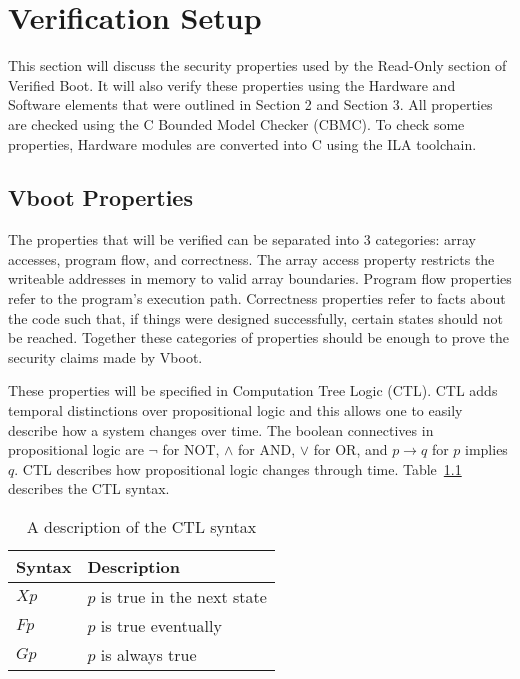 \chapter{Verification Setup}\label{sec:Verif}

This section will discuss the security properties used by the Read-Only
section of Verified Boot. 
It will also verify these properties using the Hardware and
Software elements that were outlined in Section 2 and Section 3.
All properties are checked using the C Bounded Model Checker (CBMC).
To check some properties, Hardware modules are converted into C using the ILA toolchain.

\section{Vboot Properties}

The properties that will be verified can be separated into 3 categories: array accesses, program flow, and correctness.
The array access property restricts the writeable addresses in memory to valid array boundaries. 
Program flow properties refer to the program's execution path.
Correctness properties refer to facts about the code such that, if things were
designed successfully, certain states should not be reached.
Together these categories of properties should be enough to prove the security claims made by Vboot.

These properties will be specified in Computation Tree Logic (CTL). 
CTL adds temporal distinctions over propositional logic and this allows one to easily describe how a system changes over time.
The boolean connectives in propositional logic are $\lnot$ for NOT, $\land$ for
AND, $\lor$ for OR, and $p \to q$ for $p$ implies $q$.
CTL describes how propositional logic changes through time.
Table~\ref{ctl_syn} describes the CTL syntax.

\begin{table}[!htbp]
    \centering
    \caption{A description of the CTL syntax}\label{ctl_syn}
    \begin{tabular}{ll}
        \toprule Syntax & Description  \\ \bottomrule 
        $Xp$ & $p$ is true in the next state\\ 
        $Fp$ & $p$ is true eventually\\ 
        $Gp$ & $p$ is always true\\ \bottomrule
    \end{tabular}
\end{table}

